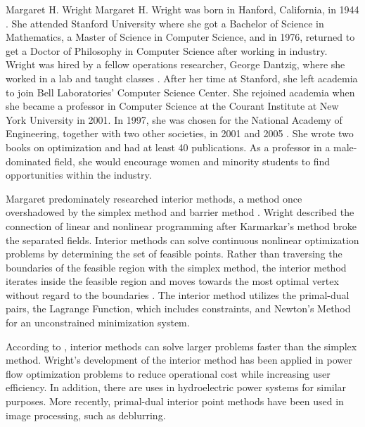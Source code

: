\begin{refsection}
\begin{pioneerspotlight}{Margaret H. Wright}
Margaret H. Wright was born in Hanford, California, in 1944 \parencite{riddle_2025_margaret}. She attended Stanford University where she got a Bachelor of Science in Mathematics, a Master of Science in Computer Science, and in 1976, returned to get a Doctor of Philosophy in Computer Science after working in industry. Wright was hired by a fellow operations researcher, George Dantzig, where she worked in a lab and taught classes \parencite{informs_2025_wright}. After her time at Stanford, she left academia to join Bell Laboratories’ Computer Science Center. She rejoined academia when she became a professor in Computer Science at the Courant Institute at New York University in 2001. In 1997, she was chosen for the National Academy of Engineering, together with two other societies, in 2001 and 2005 \parencite{riddle_2025_margaret}. She wrote two books on optimization and had at least 40 publications. As a professor in a male-dominated field, she would encourage women and minority students to find opportunities within the industry.

Margaret predominately researched interior methods, a method once overshadowed by the simplex method and barrier method \parencite{wright_2004_the}. Wright described the connection of linear and nonlinear programming after Karmarkar’s method broke the separated fields. Interior methods can solve continuous nonlinear optimization problems by determining the set of feasible points. Rather than traversing the boundaries of the feasible region with the simplex method, the interior method iterates inside the feasible region and moves towards the most optimal vertex without regard to the boundaries \parencite{lauterio_2022_interiorpoint}. The interior method utilizes the primal-dual pairs, the Lagrange Function, which includes constraints, and Newton’s Method for an unconstrained minimization system.

According to \textcite{lauterio_2022_interiorpoint}, interior methods can solve larger problems faster than the simplex method. Wright’s development of the interior method has been applied in power flow optimization problems to reduce operational cost while increasing user efficiency. In addition, there are uses in hydroelectric power systems for similar purposes. More recently, primal-dual interior point methods have been used in image processing, such as deblurring. 

\printbibliography[heading=subbibliography]
\end{pioneerspotlight}
\end{refsection}



